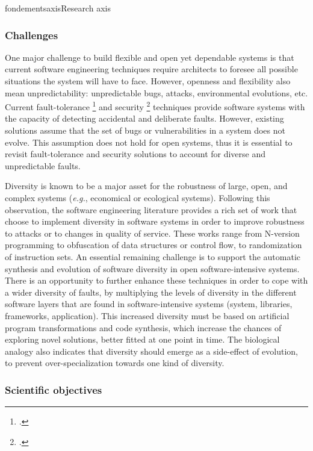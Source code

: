 \documentclass{ra2018}
\begin{document}
\begin{module}{fondements}{axis}{Research axis}
\subsubsection*{Challenges} 


One major challenge to build flexible and open yet dependable systems is that current software engineering techniques require architects to foresee all possible  situations the system will have to face. However, openness and flexibility also mean unpredictability: unpredictable bugs, attacks, environmental evolutions, etc. Current fault-tolerance   \footcite{randell75} and security   \footcite{forrest1997building} techniques  provide software systems with the capacity of detecting   accidental and deliberate faults. However, existing solutions assume that the set of bugs or vulnerabilities in a system does not evolve. This assumption does not hold for open systems, thus it is essential to revisit fault-tolerance and security solutions to account for diverse and unpredictable faults.


Diversity is known to be a major asset for the robustness of large, open, and complex systems (\textit{e.g.}, economical or ecological systems). 
Following this observation, the software engineering literature provides a rich set of work that choose to implement diversity in software systems in order to improve robustness to attacks or to changes in quality of service. 
These works range from N-version programming to obfuscation of data structures or control flow, to randomization of instruction sets. 
An essential remaining challenge is to support the automatic synthesis and evolution of software diversity in open software-intensive systems.
There is an opportunity to further enhance these techniques in order to cope with a wider diversity of faults, by multiplying the levels of diversity in the different software layers that are found in software-intensive systems (system, libraries, frameworks, application). 
This increased diversity must be based on artificial program transformations and code synthesis, which increase the chances of exploring novel solutions, better fitted at one point in time. The biological analogy also indicates that diversity should emerge as a side-effect of evolution, to prevent over-specialization towards one kind of diversity.


\subsubsection*{Scientific objectives} 


\end{module}
\end{document}
